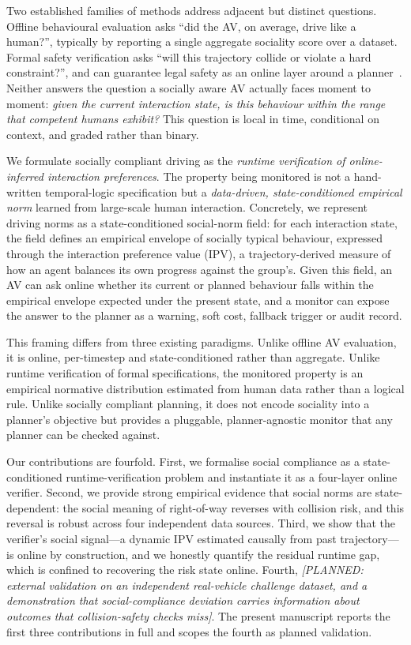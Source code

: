 \documentclass[12pt,a4paper]{article}
\newcommand{\planned}[1]{{\color{blue!60!black}\textit{[PLANNED: #1]}}}
\begin{document}
Two established families of methods address adjacent but distinct questions. Offline
behavioural evaluation asks ``did the AV, on average, drive like a human?'', typically by
reporting a single aggregate sociality score over a dataset. Formal safety verification
asks ``will this trajectory collide or violate a hard constraint?'', and can guarantee
legal safety as an online layer around a planner~\cite{pek2020online}. Neither answers the
question a socially aware AV actually faces moment to moment: \emph{given the current
interaction state, is this behaviour within the range that competent humans exhibit?} This
question is local in time, conditional on context, and graded rather than binary.

We formulate socially compliant driving as the \emph{runtime verification of
online-inferred interaction preferences}. The property being monitored is not a
hand-written temporal-logic specification but a \emph{data-driven, state-conditioned
empirical norm} learned from large-scale human interaction. Concretely, we represent
driving norms as a state-conditioned social-norm field: for each interaction state, the
field defines an empirical envelope of socially typical behaviour, expressed through the
interaction preference value (IPV), a trajectory-derived measure of how an agent balances
its own progress against the group's. Given this field, an AV can ask online whether its
current or planned behaviour falls within the empirical envelope expected under the present
state, and a monitor can expose the answer to the planner as a warning, soft cost,
fallback trigger or audit record.

This framing differs from three existing paradigms. Unlike offline AV evaluation, it is
online, per-timestep and state-conditioned rather than aggregate. Unlike runtime
verification of formal specifications, the monitored property is an empirical normative
distribution estimated from human data rather than a logical rule. Unlike socially
compliant planning, it does not encode sociality into a planner's objective but provides a
pluggable, planner-agnostic monitor that any planner can be checked against.

Our contributions are fourfold. First, we formalise social compliance as a state-conditioned
runtime-verification problem and instantiate it as a four-layer online verifier. Second, we
provide strong empirical evidence that social norms are state-dependent: the social meaning
of right-of-way reverses with collision risk, and this reversal is robust across four
independent data sources. Third, we show that the verifier's social signal---a dynamic IPV
estimated causally from past trajectory---is online by construction, and we honestly
quantify the residual runtime gap, which is confined to recovering the risk state online.
Fourth, \planned{external validation on an independent real-vehicle challenge dataset, and
a demonstration that social-compliance deviation carries information about outcomes that
collision-safety checks miss}. The present manuscript reports the first three contributions
in full and scopes the fourth as planned validation.
\end{document}
